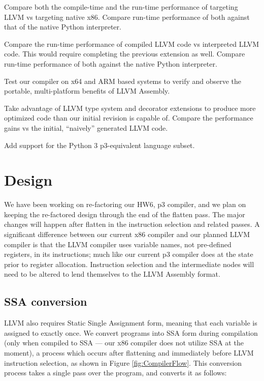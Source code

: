 \documentclass[11pt]{article}
\newenvironment{packed_item}{
\begin{itemize}
  \setlength{\itemsep}{1pt}
  \setlength{\parskip}{0pt}
  \setlength{\parsep}{0pt}
}{\end{itemize}}
\begin{document}
\begin{packed_item}
\item Compare both the compile-time and the run-time performance of
  targeting LLVM vs targeting native x86. Compare run-time performance
  of both against that of the native Python interpreter.
\item Compare the run-time performance of compiled LLVM code vs
  interpreted LLVM code. This would require completing the previous
  extension as well. Compare run-time performance
  of both against the native Python interpreter.
\item Test our compiler on x64 and ARM based systems to verify and
  observe the portable, multi-platform benefits of LLVM Assembly.
\item Take advantage of LLVM type system and decorator extensions to
  produce more optimized code than our initial revision is capable of.
  Compare the performance gains vs the initial, ``naively'' generated
  LLVM code.
\item Add support for the Python 3 p3-equivalent language subset.
\end{packed_item}

\section{Design}

We have been working on re-factoring our HW6, p3 compiler, and we plan
on keeping the re-factored design through the end of the flatten
pass. The major changes will happen after flatten in the instruction
selection and related passes. A significant difference between our
current x86 compiler and our planned LLVM compiler is that the LLVM
compiler uses variable names, not pre-defined registers, in its
instructions; much like our current p3 compiler does at the state
prior to register allocation. Instruction selection and the
intermediate nodes will need to be altered to lend themselves to the
LLVM Assembly format.

\subsection{SSA conversion}

LLVM also requires Static Single Assignment form, meaning that each
variable is assigned to exactly once.  We convert programs into SSA
form during compilation (only when compiled to SSA --- our x86
compiler does not utilize SSA at the moment), a process which occurs
after flattening and immediately before LLVM instruction selection, as
shown in Figure \ref{fig:CompilerFlow}.  This conversion process takes
a single pass over the program, and converts it as follows:
\end{document}

